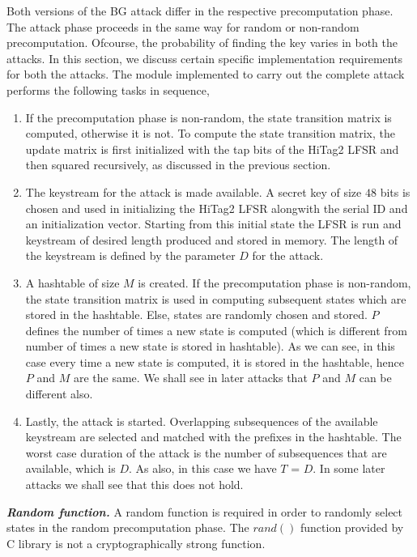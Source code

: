 Both versions of the BG attack differ in the respective precomputation phase. The attack phase proceeds in the same way for random or non-random precomputation. Ofcourse, the probability of finding the key varies in both the attacks. In this section, we discuss certain specific implementation requirements for both the attacks. The module implemented to carry out the complete attack performs the following tasks in sequence,
\begin{enumerate}
\item If the precomputation phase is non-random, the state transition matrix is computed, otherwise it is not. To compute the state transition matrix, the update matrix is first initialized with the tap bits of the HiTag2 LFSR and then squared recursively, as discussed in the previous section.
\item The keystream for the attack is made available. A secret key of size $48$ bits is chosen and used in initializing the HiTag2 LFSR alongwith the serial ID and an initialization vector. Starting from this initial state the LFSR is run and keystream of desired length produced and stored in memory.
The length of the keystream is defined by the parameter $D$ for the attack.
\item A hashtable of size $M$ is created. If the precomputation phase is non-random, the state transition matrix is used in computing subsequent states which are stored in the hashtable. Else, states are randomly chosen and stored. $P$ defines the number of times a new state is computed (which is different from number of times a new state is stored in hashtable). As we can see, in this case every time a new state is computed, it is stored in the hashtable, hence $P$ and $M$ are the same. We shall see in later attacks that $P$ and $M$ can be different also. 
\item Lastly, the attack is started. Overlapping subsequences of the available keystream are selected and matched with the prefixes in the hashtable. The worst case duration of the attack is the number of subsequences that are available, which is $D$. As also, in this case we have $T$ = $D$. In some later attacks we shall see that this does not hold. 
\end{enumerate}


\noindent \textit{\textbf{Random function.}}
A random function is required in order to randomly select states in the random precomputation phase. The $rand()$ function provided by C library is not a cryptographically strong function. 






